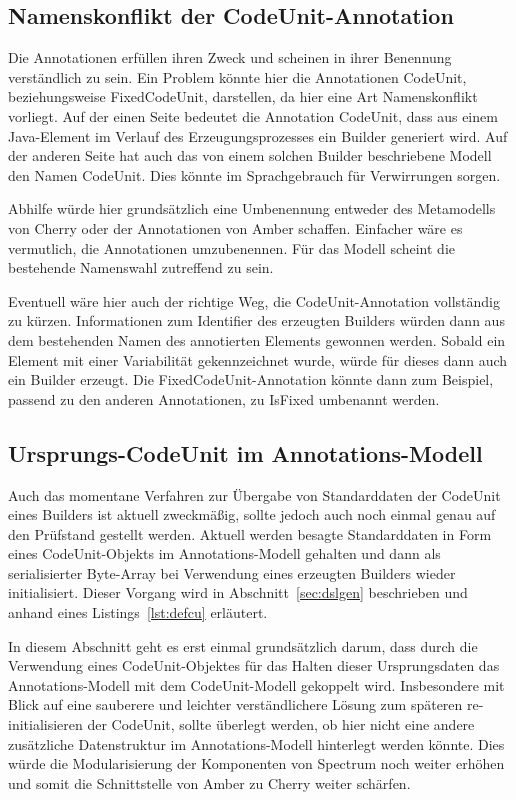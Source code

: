 \documentclass[12pt,oneside,a4paper,parskip]{scrbook}
\begin{document}
\subsection{Namenskonflikt der CodeUnit-Annotation}

Die Annotationen erfüllen ihren Zweck und scheinen in ihrer Benennung verständlich zu sein. Ein Problem könnte hier die Annotationen CodeUnit, beziehungsweise FixedCodeUnit, darstellen, da hier eine Art Namenskonflikt vorliegt. Auf der einen Seite bedeutet die Annotation CodeUnit, dass aus einem Java-Element im Verlauf des Erzeugungsprozesses ein Builder generiert wird. Auf der anderen Seite hat auch das von einem solchen Builder beschriebene Modell den Namen CodeUnit. Dies könnte im Sprachgebrauch für Verwirrungen sorgen.

Abhilfe würde hier grundsätzlich eine Umbenennung entweder des Metamodells von Cherry oder der Annotationen von Amber schaffen. Einfacher wäre es vermutlich, die Annotationen umzubenennen. Für das Modell scheint die bestehende Namenswahl zutreffend zu sein.

Eventuell wäre hier auch der richtige Weg, die CodeUnit-Annotation vollständig zu kürzen. Informationen zum Identifier des erzeugten Builders würden dann aus dem bestehenden Namen des annotierten Elements gewonnen werden. Sobald ein Element mit einer Variabilität gekennzeichnet wurde, würde für dieses dann auch ein Builder erzeugt. Die FixedCodeUnit-Annotation könnte dann zum Beispiel, passend zu den anderen Annotationen, zu IsFixed umbenannt werden.

\subsection{Ursprungs-CodeUnit im Annotations-Modell}

Auch das momentane Verfahren zur Übergabe von Standarddaten der CodeUnit eines Builders ist aktuell zweckmäßig, sollte jedoch auch noch einmal genau auf den Prüfstand gestellt werden. Aktuell werden besagte Standarddaten in Form eines CodeUnit-Objekts im Annotations-Modell gehalten und dann als serialisierter Byte-Array bei Verwendung eines erzeugten Builders wieder initialisiert. Dieser Vorgang wird in Abschnitt~\ref{sec:dslgen} beschrieben und anhand eines Listings~\ref{lst:defcu} erläutert.

In diesem Abschnitt geht es erst einmal grundsätzlich darum, dass durch die Verwendung eines CodeUnit-Objektes für das Halten dieser Ursprungsdaten das Annotations-Modell mit dem CodeUnit-Modell gekoppelt wird. Insbesondere mit Blick auf eine sauberere und leichter verständlichere Lösung zum späteren re-initialisieren der CodeUnit, sollte überlegt werden, ob hier nicht eine andere zusätzliche Datenstruktur im Annotations-Modell hinterlegt werden könnte. Dies würde die Modularisierung der Komponenten von Spectrum noch weiter erhöhen und somit die Schnittstelle von Amber zu Cherry weiter schärfen.
\end{document}
